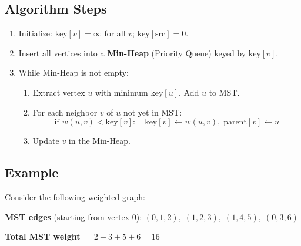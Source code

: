 \documentclass[12pt,a4paper]{article}
\begin{document}
\subsection{Algorithm Steps}
\begin{enumerate}
    \item Initialize: $\text{key}[v] = \infty$ for all $v$; $\text{key}[\text{src}] = 0$.
    \item Insert all vertices into a \textbf{Min-Heap} (Priority Queue) keyed by $\text{key}[v]$.
    \item While Min-Heap is not empty:
    \begin{enumerate}
        \item Extract vertex $u$ with minimum $\text{key}[u]$. Add $u$ to MST.
        \item For each neighbor $v$ of $u$ not yet in MST:
        \[
            \text{if } w(u,v) < \text{key}[v]: \quad \text{key}[v] \leftarrow w(u,v),\; \text{parent}[v] \leftarrow u
        \]
        \item Update $v$ in the Min-Heap.
    \end{enumerate}
\end{enumerate}

\subsection{Example}

Consider the following weighted graph:
\begin{center}
\end{center}

\textbf{MST edges} (starting from vertex 0): $(0,1,2),\; (1,2,3),\; (1,4,5),\; (0,3,6)$

\textbf{Total MST weight} $= 2 + 3 + 5 + 6 = 16$
\end{document}
